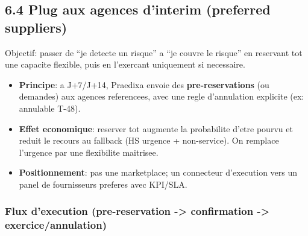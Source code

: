 \documentclass[11pt,a4paper]{article}
\begin{document}
\subsection*{6.4 Plug aux agences d'interim (preferred suppliers)}
Objectif: passer de ``je detecte un risque'' a ``je couvre le risque'' en reservant tot une capacite flexible, puis en l'exercant uniquement si necessaire.
\begin{itemize}
  \item \textbf{Principe}: a J+7/J+14, Praedixa envoie des \textbf{pre-reservations} (ou demandes) aux agences referencees, avec une regle d'annulation explicite (ex: annulable T-48).
  \item \textbf{Effet economique}: reserver tot augmente la probabilite d'etre pourvu et reduit le recours au fallback (HS urgence + non-service). On remplace l'urgence par une flexibilite maitrisee.
  \item \textbf{Positionnement}: pas une marketplace; un connecteur d'execution vers un panel de fournisseurs preferes avec KPI/SLA.
\end{itemize}

\subsubsection*{Flux d'execution (pre-reservation -> confirmation -> exercice/annulation)}
\begin{center}
\end{center}
\end{document}
